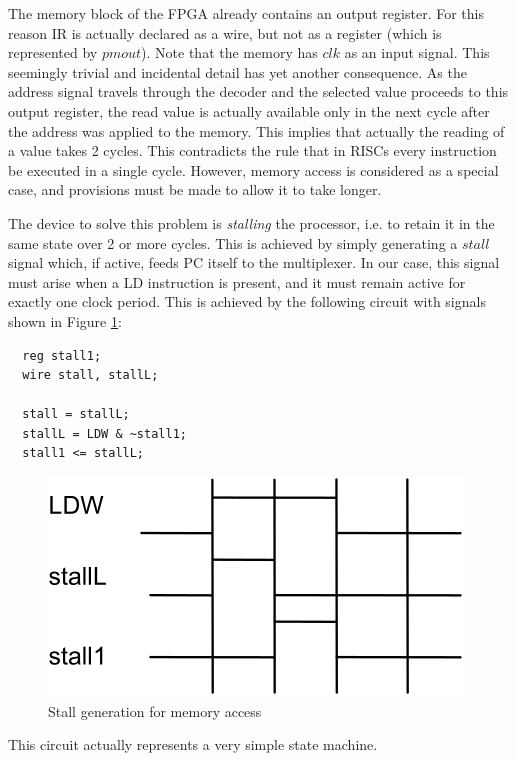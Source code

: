 The memory block of the FPGA already contains an output register. For this reason IR is actually
declared as a wire, but not as a register (which is represented by $pmout$). Note that the memory
has $clk$ as an input signal. This seemingly trivial and incidental detail has yet another
consequence. As the address signal travels through the decoder and the selected value proceeds to
this output register, the read value is actually available only in the next cycle after the address
was applied to the memory. This implies that actually the reading of a value takes 2 cycles. This
contradicts the rule that in RISCs every instruction be executed in a single cycle. However, memory
access is considered as a special case, and provisions must be made to allow it to take longer.

The device to solve this problem is \emph{stalling} the processor, i.e. to retain it in the same
state over 2 or more cycles. This is achieved by simply generating a $stall$ signal which, if
active, feeds PC itself to the multiplexer. In our case, this signal must arise when a LD
instruction is present, and it must remain active for exactly one clock period. This is achieved
by the following circuit with signals shown in Figure \ref{fig:stall}:
\begin{verbatim}
  reg stall1;
  wire stall, stallL;
 
  stall = stallL;
  stallL = LDW & ~stall1;
  stall1 <= stallL;
\end{verbatim}
\begin{figure}[h!]
  \centering
  \includegraphics[width=.9\textwidth]{i/8.png}
  \caption{Stall generation for memory access}
  \label{fig:stall}
\end{figure}
This circuit actually represents a very simple state machine.
 
